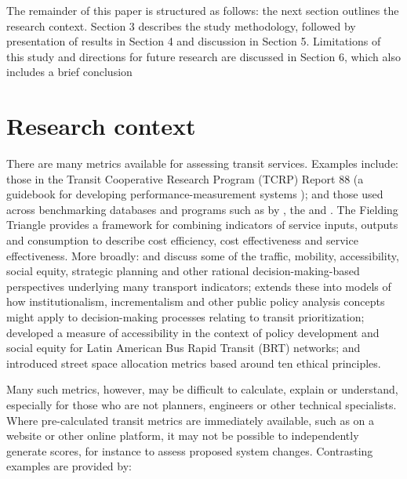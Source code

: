 \documentclass[preprint, 3p,
authoryear]{elsarticle} %
\begin{document}
The remainder of this paper is structured as follows: the next section
outlines the research context. Section 3 describes the study
methodology, followed by presentation of results in Section 4 and
discussion in Section 5. Limitations of this study and directions for
future research are discussed in Section 6, which also includes a brief
conclusion

\section{Research context}\label{research-context}

There are many metrics available for assessing transit services.
Examples include: those in the Transit Cooperative Research Program
(TCRP) Report 88 (a guidebook for developing performance-measurement
systems \citep{Ryus:2003aa}); and those used across benchmarking
databases and programs such as by
\citet{Florida-Transit-Information-System:2018aa}, the
\citet{UITP:2015aa} and \citet{Imperial-College-London:2023aa}. The
Fielding Triangle \citep{FieldingGordonJ1987Mpts} provides a framework
for combining indicators of service inputs, outputs and consumption to
describe cost efficiency, cost effectiveness and service effectiveness.
More broadly: \citet{Litman:2003ab} and \citet{Litman:2016aa} discuss
some of the traffic, mobility, accessibility, social equity, strategic
planning and other rational decision-making-based perspectives
underlying many transport indicators; \citet{Reynolds:2017ah} extends
these into models of how institutionalism, incrementalism and other
public policy analysis concepts might apply to decision-making processes
relating to transit prioritization; \citet{GuzmanLuisA.2017Aeit}
developed a measure of accessibility in the context of policy
development and social equity for Latin American Bus Rapid Transit (BRT)
networks; and \citet{Creutzig2020streetspaceallocation} introduced
street space allocation metrics based around ten ethical principles.

Many such metrics, however, may be difficult to calculate, explain or
understand, especially for those who are not planners, engineers or
other technical specialists. Where pre-calculated transit metrics are
immediately available, such as on a website or other online platform, it
may not be possible to independently generate scores, for instance to
assess proposed system changes. Contrasting examples are provided by:
\end{document}
